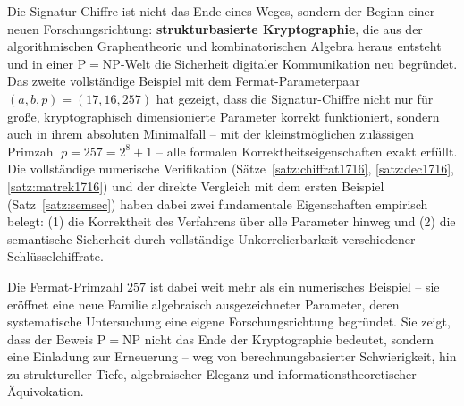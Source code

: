 ﻿\documentclass[a4paper,12pt]{scrreprt}
\theoremstyle{definition}
\begin{document}
Die Signatur-Chiffre ist nicht das Ende eines Weges, sondern der Beginn einer neuen Forschungsrichtung: \textbf{strukturbasierte Kryptographie}, die aus der algorithmischen Graphentheorie und kombinatorischen Algebra heraus entsteht und in einer $\mathrm{P}=\mathrm{NP}$-Welt die Sicherheit digitaler Kommunikation neu begründet. Das zweite vollständige Beispiel mit dem Fermat-Parameterpaar $(a, b, p) = (17, 16, 257)$ hat gezeigt, dass die Signatur-Chiffre nicht nur für große, kryptographisch dimensionierte Parameter korrekt funktioniert, sondern auch in ihrem absoluten Minimalfall -- mit der kleinstmöglichen zulässigen Primzahl $p = 257 = 2^8 + 1$ -- alle formalen Korrektheitseigenschaften exakt erfüllt. Die vollständige numerische Verifikation (Sätze~\ref{satz:chiffrat1716}, \ref{satz:dec1716}, \ref{satz:matrek1716}) und der direkte Vergleich mit dem ersten Beispiel (Satz~\ref{satz:semsec}) haben dabei zwei fundamentale Eigenschaften empirisch belegt: (1) die Korrektheit des Verfahrens über alle Parameter hinweg und (2) die semantische Sicherheit durch vollständige Unkorrelierbarkeit verschiedener Schlüsselchiffrate.

Die Fermat-Primzahl $257$ ist dabei weit mehr als ein numerisches Beispiel -- sie eröffnet eine neue Familie algebraisch ausgezeichneter Parameter, deren systematische Untersuchung eine eigene Forschungsrichtung begründet. Sie zeigt, dass der Beweis $\mathrm{P}=\mathrm{NP}$ nicht das Ende der Kryptographie bedeutet, sondern eine Einladung zur Erneuerung -- weg von berechnungsbasierter Schwierigkeit, hin zu struktureller Tiefe, algebraischer Eleganz und informationstheoretischer Äquivokation.
\end{document}
